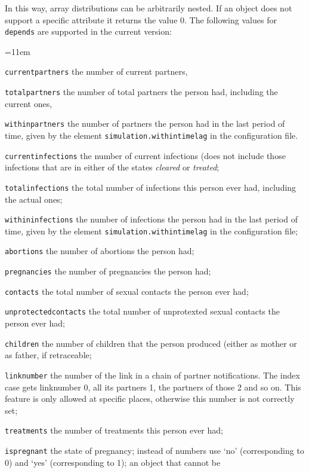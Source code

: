 \documentclass[11pt]{article}
\begin{document}
In this way, array distributions can be arbitrarily nested. If an object does
not support a specific attribute it returns the value 0. The following
values for \texttt{depends} are supported in the current version: 
\begin{list}{}{\small
\renewcommand{\makelabel}{}
\setlength{\itemsep}{0ex}=11em\setlength{\leftmargin}{12em}}
\item[\tt currentpartners] the number of current partners,
\item[\tt totalpartners] the number of total partners the person had, including
the current ones,
\item[\tt withinpartners] the number of partners the person had in the last
period of time, given by the element \texttt{simulation.withintimelag} in the
configuration file.     
\item[\tt currentinfections] the number of current infections (does not include
those infections that are in either of the states \emph{cleared} or
\emph{treated};
\item[\tt totalinfections] the total number of infections this person ever had,
including the actual ones; 
\item[\tt withininfections] the number of infections the person had in the last
period of time, given by the element \texttt{simulation.withintimelag} in the
configuration file;
\item[\tt abortions] the number of abortions the person had;
\item[\tt pregnancies] the number of pregnancies the person had;
\item[\tt contacts] the total number of sexual contacts the person ever had;
\item[\tt unprotectedcontacts] the total number of unprotexted sexual contacts
the person ever had;
\item[\tt children] the number of children that the person produced (either as
mother or as father, if retraceable;
\item[\tt linknumber] the number of the link in a chain of partner
notifications. The index case gets linknumber 0, all its partners 1, the
partners of those 2 and so on. This feature is only allowed at specific places,
otherwise this number is not correctly set;
\item[\tt treatments] the number of treatments this person ever had;
\item[\tt ispregnant] the state of pregnancy; instead of numbers use `no'
(corresponding to 0) and `yes' (corresponding to 1); an object that cannot be

\end{list}
\end{document}
